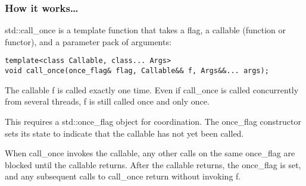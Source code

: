 \subsubsection{How it works…}

std::call\_once is a template function that takes a flag, a callable (function or functor), and a parameter pack of arguments:

\begin{lstlisting}[style=styleCXX]
template<class Callable, class... Args>
void call_once(once_flag& flag, Callable&& f, Args&&... args);
\end{lstlisting}

The callable f is called exactly one time. Even if call\_once is called concurrently from several threads, f is still called once and only once.

This requires a std::once\_flag object for coordination. The once\_flag constructor sets its state to indicate that the callable has not yet been called.

When call\_once invokes the callable, any other calls on the same once\_flag are blocked until the callable returns. After the callable returns, the once\_flag is set, and any subsequent calls to call\_once return without invoking f.



















